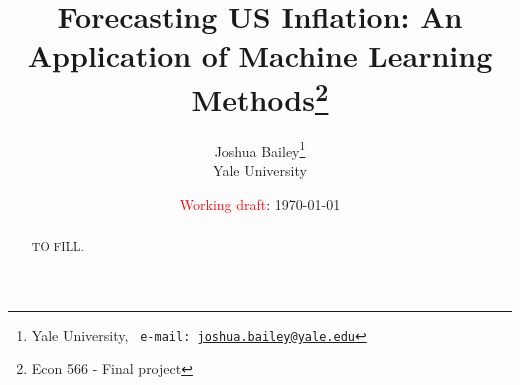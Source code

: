 
\begin{titlepage}

\title{Forecasting US Inflation: An Application of Machine Learning Methods\footnote{Econ 566 - Final project}} 
\author{Joshua Bailey\thanks{Yale University, \texttt{\ e-mail:  \href{mailto: joshua.bailey@yale.edu}{joshua.bailey@yale.edu}}
}
\\ 
\normalsize{Yale University}
}


\date{\textcolor{red}{Working draft}: \today}
\maketitle
\vspace{-20pt}
\begin{abstract}
\begin{adjustwidth}{-15pt}{-15pt}
\thispagestyle{empty}

\noindent TO FILL. \\[1pt]

\end{adjustwidth}
\end{abstract}



\end{titlepage}


\pagebreak

\hypersetup{linkcolor=black}
\tableofcontents
\listoffigures
\listoftables
\hypersetup{linkcolor=blue}


 